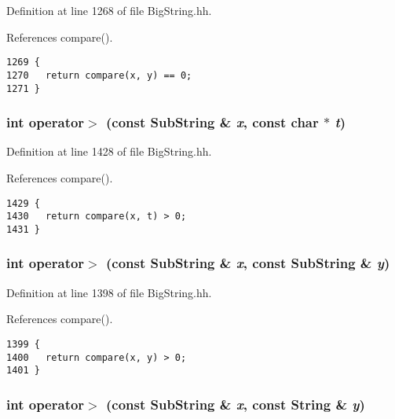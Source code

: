 Definition at line 1268 of file Big\-String.hh.

References compare().



\footnotesize\begin{verbatim}1269 {
1270   return compare(x, y) == 0; 
1271 }
\end{verbatim}\normalsize 
{}
\subsubsection{\setlength{\rightskip}{0pt plus 5cm}int operator$>$ (const {\bf Sub\-String} \& {\em x}, const char $\ast$ {\em t})\hspace{0.3cm}{\tt  [inline]}}\label{BigString_8hh_a118}




Definition at line 1428 of file Big\-String.hh.

References compare().



\footnotesize\begin{verbatim}1429 {
1430   return compare(x, t) > 0; 
1431 }
\end{verbatim}\normalsize 
{}
\subsubsection{\setlength{\rightskip}{0pt plus 5cm}int operator$>$ (const {\bf Sub\-String} \& {\em x}, const {\bf Sub\-String} \& {\em y})\hspace{0.3cm}{\tt  [inline]}}\label{BigString_8hh_a112}




Definition at line 1398 of file Big\-String.hh.

References compare().



\footnotesize\begin{verbatim}1399 {
1400   return compare(x, y) > 0;
1401 }
\end{verbatim}\normalsize 
{}
\subsubsection{\setlength{\rightskip}{0pt plus 5cm}int operator$>$ (const {\bf Sub\-String} \& {\em x}, const {\bf String} \& {\em y})\hspace{0.3cm}{\tt  [inline]}}\label{BigString_8hh_a106}




